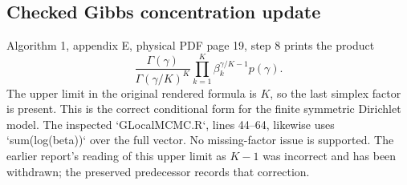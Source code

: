 \documentclass[10pt]{article}
\begin{document}
\subsection*{Checked Gibbs concentration update}
Algorithm 1, appendix E, physical PDF page 19, step 8 prints the product \[\frac{\Gamma(\gamma)}{\Gamma(\gamma/K)^K}
 \prod_{k=1}^{K}\beta_k^{\gamma/K-1}p(\gamma).\] The upper limit in the original rendered formula is \(K\), so the last simplex factor is present. This is the correct conditional form for the finite symmetric Dirichlet model. The inspected `GLocalMCMC.R`, lines 44–64, likewise uses `sum(log(beta))` over the full vector. No missing-factor issue is supported. The earlier report’s reading of this upper limit as \(K-1\) was incorrect and has been withdrawn; the preserved predecessor records that correction.\par
\end{document}
